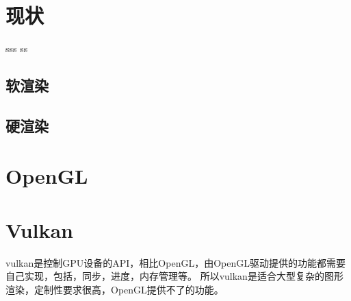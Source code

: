 \clearpage
\section{现状}
sss ss 
\subsection{软渲染}


\subsection{硬渲染}

\section{OpenGL}

\clearpage
\section{Vulkan}
vulkan是控制GPU设备的API，相比OpenGL，由OpenGL驱动提供的功能都需要自己实现，包括，同步，进度，内存管理等。
所以vulkan是适合大型复杂的图形渲染，定制性要求很高，OpenGL提供不了的功能。

